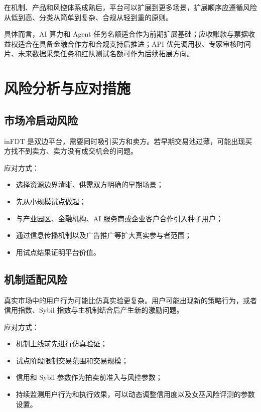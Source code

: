 \documentclass[UTF8,a4paper,12pt]{ctexart}
\begin{document}
在机制、产品和风控体系成熟后，平台可以扩展到更多场景，扩展顺序应遵循风险从低到高、分类从简单到复杂、合规从轻到重的原则。

具体而言，AI 算力和 Agent 任务名额适合作为前期扩展基础；应收账款与票据收益权适合在具备金融合作方和合规支持后推进；API 优先调用权、专家审核时间片、未来数据采集任务和红队测试名额可作为后续拓展方向。

\newpage
\section{风险分析与应对措施}

\subsection{市场冷启动风险}

inFDT 是双边平台，需要同时吸引买方和卖方。若早期交易池过薄，可能出现买方找不到卖方、卖方没有成交机会的问题。

应对方式：

\begin{itemize}
    \item 选择资源边界清晰、供需双方明确的早期场景；
    \item 先从小规模试点做起；
    \item 与产业园区、金融机构、AI 服务商或企业客户合作引入种子用户；
    \item 通过信息传播机制以及广告推广等扩大真实参与者范围；
    \item 用试点结果证明平台价值。
\end{itemize}

\subsection{机制适配风险}

真实市场中的用户行为可能比仿真实验更复杂。用户可能出现新的策略行为，或者信用指数、Sybil 指数与主机制结合后产生新的激励问题。

应对方式：

\begin{itemize}
    \item 机制上线前先进行仿真验证；
    \item 试点阶段限制交易范围和交易规模；
    \item 信用和 Sybil 参数作为拍卖前准入与风控参数；
    \item 持续监测用户行为和执行效果，可以动态调整信用度以及女巫风险评测的参数设置。
\end{itemize}
\end{document}
